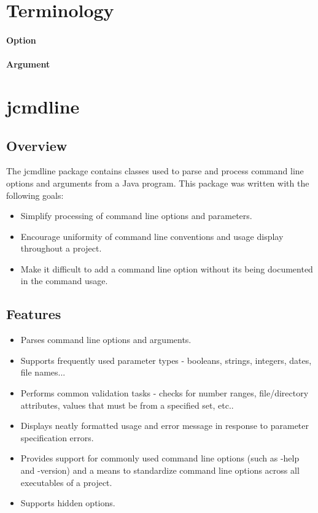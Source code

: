 \documentclass[a4paper,10pt]{article}
\begin{document}
\section{Terminology}
\paragraph{Option}
\paragraph{Argument}

\section{jcmdline}
\subsection{Overview}
The jcmdline package contains classes used to parse and process command line options and arguments from a Java program. This package was written with the following goals:
\begin{itemize}
    \item Simplify processing of command line options and parameters.
    \item Encourage uniformity of command line conventions and usage display throughout a project.
    \item Make it difficult to add a command line option without its being documented in the command usage.
\end{itemize}
\subsection{Features}
\begin{itemize}
    \item  Parses command line options and arguments.
    \item Supports frequently used parameter types - booleans, strings, integers, dates, file names...
    \item Performs common validation tasks - checks for number ranges, file/directory attributes, 
          values that must be from a specified set, etc..
    \item Displays neatly formatted usage and error message in response to parameter specification errors.
    \item Provides support for commonly used command line options (such as -help and -version) and a 
          means to standardize command line options across all executables of a project.
    \item Supports hidden options.
\end{itemize}
\end{document}
